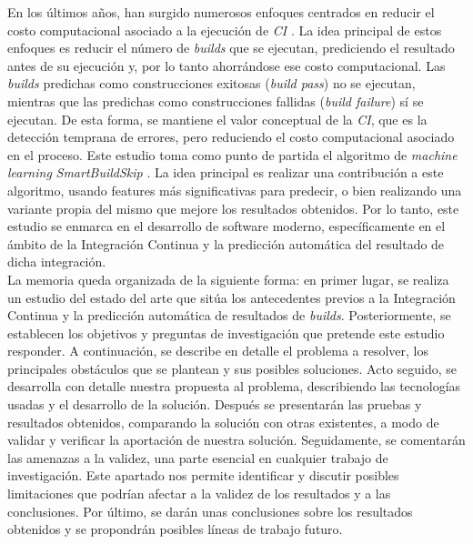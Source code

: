 En los últimos años, han surgido numerosos enfoques centrados en reducir el costo computacional
asociado a la ejecución de \textit{CI} \cite{2,4,5,6,7,8}. La idea principal de estos enfoques es
reducir el número de \textit{builds} que se ejecutan, prediciendo el resultado antes de su
ejecución y, por lo tanto ahorrándose ese costo computacional. Las \textit{builds} predichas como
construcciones exitosas (\textit{build pass}) no se ejecutan, mientras que las predichas como
construcciones fallidas (\textit{build failure}) sí se ejecutan. De esta forma, se mantiene el
valor conceptual de la \textit{CI}, que es la detección temprana de errores, pero reduciendo
el costo computacional asociado en el proceso. Este estudio toma como punto de partida el
algoritmo de \textit{machine learning} \textit{SmartBuildSkip} \cite{2}. La idea principal es
realizar una contribución a este algoritmo, usando features más significativas para predecir, o
bien realizando una variante propia del mismo que mejore los resultados obtenidos. Por lo tanto,
este estudio se enmarca en el desarrollo de software moderno, específicamente en el ámbito de
la Integración Continua y la predicción automática del resultado de dicha integración.\\

La memoria queda organizada de la siguiente forma: en primer lugar, se realiza un estudio del
estado del arte que sitúa los antecedentes previos a la Integración Continua y la predicción
automática de resultados de \textit{builds}. Posteriormente, se establecen los objetivos y
preguntas de investigación que pretende este estudio responder. A continuación, se describe
en detalle el problema a resolver, los principales obstáculos que se plantean y sus posibles
soluciones. Acto seguido, se desarrolla con detalle nuestra propuesta al problema, describiendo
las tecnologías usadas y el desarrollo de la solución. Después se presentarán las pruebas y
resultados obtenidos, comparando la solución con otras existentes, a modo de validar y verificar
la aportación de nuestra solución. Seguidamente, se comentarán las amenazas a la validez, una
parte esencial en cualquier trabajo de investigación. Este apartado nos permite identificar y
discutir posibles limitaciones que podrían afectar a la validez de los resultados y a las
conclusiones. Por último, se darán unas conclusiones sobre los resultados obtenidos y se
propondrán posibles líneas de trabajo futuro.
